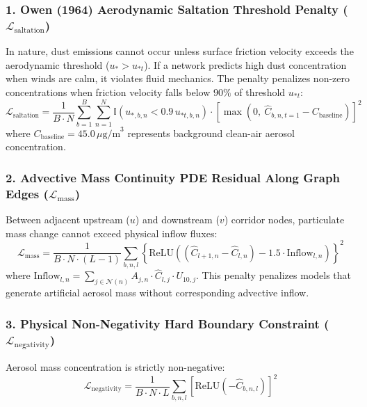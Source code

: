 \subsubsection{1. Owen (1964) Aerodynamic Saltation Threshold Penalty ($\mathcal{L}_{\text{saltation}}$)}
In nature, dust emissions cannot occur unless surface friction velocity exceeds the aerodynamic threshold ($u_* > u_{*t}$). If a network predicts high dust concentration when winds are calm, it violates fluid mechanics. The penalty penalizes non-zero concentrations when friction velocity falls below $90\%$ of threshold $u_{*t}$:
\begin{equation}
\label{eq:loss_saltation}
\mathcal{L}_{\text{saltation}} = \frac{1}{B \cdot N} \sum_{b=1}^B \sum_{n=1}^N \mathbb{I}\left(u_{*, b, n} < 0.9 \, u_{*t, b, n}\right) \cdot \left[ \max\left(0, \ \hat{C}_{b, n, t=1} - C_{\text{baseline}}\right) \right]^2
\end{equation}
where $C_{\text{baseline}} = 45.0\,\mu\text{g/m}^3$ represents background clean-air aerosol concentration.

\subsubsection{2. Advective Mass Continuity PDE Residual Along Graph Edges ($\mathcal{L}_{\text{mass}}$)}
Between adjacent upstream ($u$) and downstream ($v$) corridor nodes, particulate mass change cannot exceed physical inflow fluxes:
\begin{equation}
\label{eq:loss_mass}
\mathcal{L}_{\text{mass}} = \frac{1}{B \cdot N \cdot (L-1)} \sum_{b, n, l} \left\{ \text{ReLU}\left( \left(\hat{C}_{l+1, n} - \hat{C}_{l, n}\right) - 1.5 \cdot \text{Inflow}_{l, n} \right) \right\}^2
\end{equation}
where $\text{Inflow}_{l, n} = \sum_{j \in \mathcal{N}(n)} A_{j, n} \cdot \hat{C}_{l, j} \cdot U_{10, j}$. This penalty penalizes models that generate artificial aerosol mass without corresponding advective inflow.

\subsubsection{3. Physical Non-Negativity Hard Boundary Constraint ($\mathcal{L}_{\text{negativity}}$)}
Aerosol mass concentration is strictly non-negative:
\begin{equation}
\label{eq:loss_negativity}
\mathcal{L}_{\text{negativity}} = \frac{1}{B \cdot N \cdot L} \sum_{b, n, l} \left[ \text{ReLU}\left(-\hat{C}_{b, n, l}\right) \right]^2
\end{equation}


